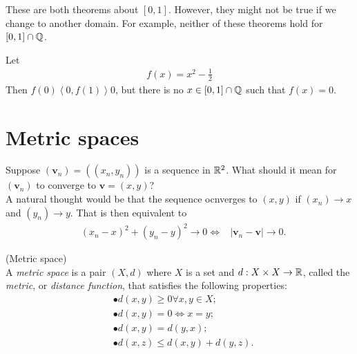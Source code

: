 \documentclass[a4paper]{article}
\begin{document}
These are both theorems about $\left[0,1\right]$. However, they might not be true if we change to another domain. For example, neither of these theorems hold for $\left[0,1\right] \cap \mathbb{Q}$.

\begin{eg}
Let
\begin{equation*}
\begin{aligned}
f\left(x\right) = x^2-\frac{1}{2}
\end{aligned}
\end{equation*}
Then $f\left(0\right)\left<0, f\left(1\right)\right>0$, but there is no $x\in\left[0,1\right] \cap \mathbb{Q}$ such that $f\left(x\right) = 0$.
\end{eg}

\newpage
\section{Metric spaces}
Suppose $\left(\mathbf{v}_n\right) = \left(\left(x_n,y_n\right)\right)$ is a sequence in $\mathbb{R}^2$. What should it mean for $\left(\mathbf{v}_n\right)$ to converge to $\mathbf{v} = \left(x,y\right)$?\\
A natural thought would be that the sequence ocnverges to $\left(x,y\right)$ if $\left(x_n\right) \to x$ and $\left(y_n\right) \to y$. That is then equivalent to
\begin{equation*}
\begin{aligned}
&\left(x_n-x\right)^2 + \left(y_n-y\right)^2 \to 0 \iff
&|\mathbf{v}_n-\mathbf{v}| \to 0.
\end{aligned}
\end{equation*}

\begin{defi} (Metric space)\\
A \emph{metric space} is a pair $\left(X,d\right)$ where $X$ is a set and $d:X\times X \to \mathbb{R}$, called the \emph{metric}, or \emph{distance function}, that satisfies the following properties:
\begin{equation*}
\begin{aligned}
&\bullet d\left(x,y\right) \geq 0 \forall x,y\in X;\\
&\bullet d\left(x,y\right) = 0 \iff x=y;\\
&\bullet d\left(x,y\right) = d\left(y,x\right);\\
&\bullet d\left(x,z\right) \leq d\left(x,y\right) + d\left(y,z\right).
\end{aligned}
\end{equation*}
\end{defi}
\end{document}

